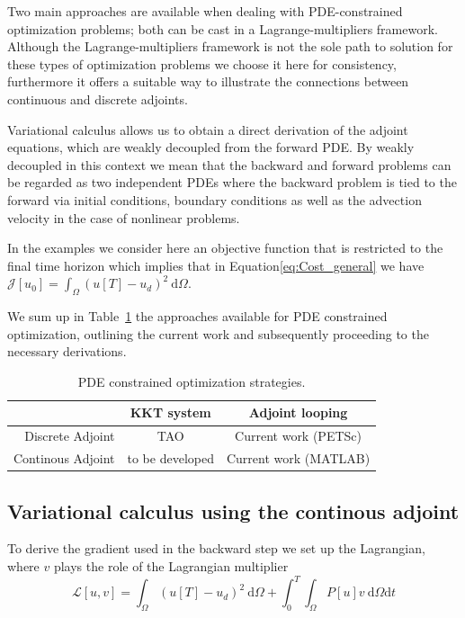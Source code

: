 \documentclass[10pt]{article}
\renewcommand{\d}{\mathrm{d}}
\begin{document}
{Two main approaches are available when dealing with PDE-constrained optimization problems; both can be cast in a Lagrange-multipliers framework. Although the Lagrange-multipliers framework is not the sole path to solution for these types of optimization problems we choose it here for consistency, furthermore it offers a suitable way to illustrate the connections between continuous and discrete adjoints.

Variational calculus allows us to obtain a direct derivation of the adjoint equations, which are weakly decoupled from the forward PDE. By weakly decoupled in this context we mean that the backward and forward problems can be regarded as two independent PDEs where the backward problem is tied to the forward via initial conditions, boundary conditions as well as the advection velocity in the case of nonlinear problems.

In the examples we consider here an objective function that is  restricted to the final time horizon which implies that in Equation\ref{eq:Cost_general} we have $\mathcal{J}[u_0]=\int_{\Omega}( u[T]- u_d)^2 \ \d \Omega$. 

We sum up in Table~\ref{sum} the approaches available for PDE constrained optimization, outlining the current work and subsequently proceeding to the necessary derivations.

\begin{table}
\centering
\begin{tabular}{|r|c|c|}
  \hline
   & KKT system & Adjoint looping \\
  \hline\hline
  Discrete Adjoint & TAO\footnotemark
   & Current work (PETSc) \\ 
  Continous Adjoint& to be developed & Current work (MATLAB)\\
  \hline
\end{tabular}
\caption{PDE constrained optimization strategies.}\label{sum}
\end{table}
\subsection{Variational calculus using the continous adjoint\label{sec:adj:continuous}} 

To derive the gradient used in the backward step we set up the Lagrangian, where $v$ plays the role of the Lagrangian multiplier
$$\mathcal{L}[ u,  v]=\int_{\Omega}( u[T]- u_d)^2 \ \d \Omega +\int_0^T\int_{\Omega} P[ u]  v \ \d \Omega \d t $$

}
\end{document}
